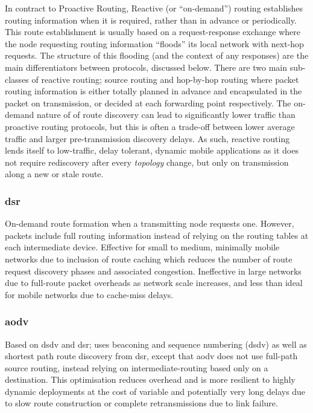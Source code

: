 In contract to Proactive Routing, Reactive (or ``on-demand'') routing establishes routing information when it is required, rather than in advance or periodically.
This route establishment is usually based on a request-response exchange where the node requesting routing information ``floods'' its local network with next-hop requests.
The structure of this flooding (and the context of any responses) are the main differentiators between protocols, discussed below.
There are two main sub-classes of reactive routing; source routing and hop-by-hop routing where packet routing information is either totally planned in advance and encapsulated in the packet on transmission, or decided at each forwarding point respectively.
The on-demand nature of of route discovery can lead to significantly lower traffic than proactive routing protocols, but this is often a trade-off between lower average traffic and larger pre-transmission discovery delays. 
As such, reactive routing lends itself to low-traffic, delay tolerant, dynamic mobile applications as it does not require rediscovery after every \emph{topology} change, but only on transmission along a new or stale route.

\subsubsection{\gls{dsr}}
On-demand route formation when a transmitting node requests one. However, packets include full routing information instead of relying on the routing tables at each intermediate device\cite{Johnson1996}. Effective for small to medium, minimally mobile networks due to inclusion of route caching which reduces the number of route request discovery phases and associated congestion. Ineffective in large networks due to full-route packet overheads as network scale increases, and less than ideal for mobile networks due to cache-miss delays.\\
\subsubsection{\gls{aodv}}
Based on \gls{dsdv} and \gls{dsr}; uses beaconing and sequence numbering (\gls{dsdv}) as well as shortest path route discovery from \gls{dsr}, except that \gls{aodv} does not use full-path source routing, instead relying on intermediate-routing based only on a destination. This optimisation reduces overhead and is more resilient to highly dynamic deployments at the cost of variable and potentially very long delays due to slow route construction or complete retransmissions due to link failure.\cite{Rai2010a}  \\
